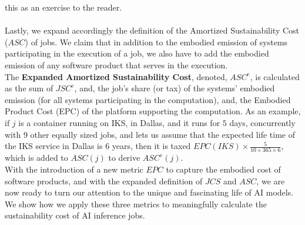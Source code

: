 this as an exercise to the reader. 
\\
\\
Lastly, we expand accordingly the definition of the Amortized Sustainability Cost ($ASC$) of jobs. 
We claim that in addition to the embodied emission of systems participating in the execution of 
a job, we also have to add the embodied emission of any software product that serves in the execution. \\
The {\bf Expanded Amortized Sustainability Cost}, denoted, $ASC^e$, is calculated as the sum of 
$JSC^e$, and, the job’s share (or tax) of the systems' embodied emission (for all systems 
participating in the computation), and, the Embodied Product Cost (EPC) of the platform supporting the computation.
As an example, if $j$ is a container running on IKS, in Dallas, and it runs for $5$ days, concurrently 
with $9$ other equally sized jobs, and lets us assume that the expected life time of 
the IKS service in Dallas is $6$ years, then it is taxed $EPC(IKS) \times \frac{5}{10 \times 365 \times 6}$, which is added to $ASC(j)$ to derive $ASC^e(j)$. 
\\
With the introduction of a new metric $EPC$ to capture the embodied cost of software products, and 
with the expanded definition of $JCS$ and $ASC$, we are now ready to turn our attention to the 
unique and fascinating life of AI models. We show how we apply these three metrics to meaningfully calculate the sustainability cost of AI inference jobs. 
